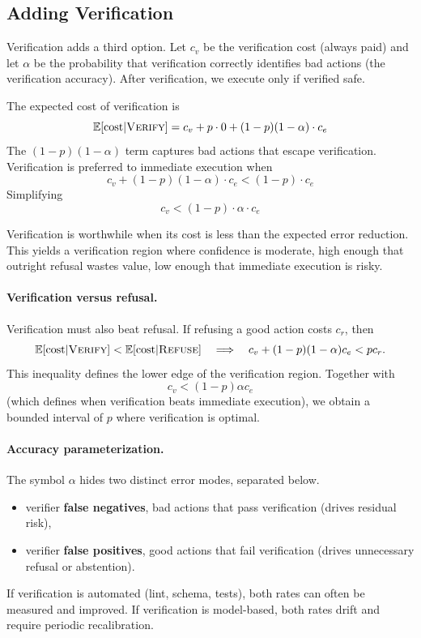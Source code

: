\subsection{Adding Verification}

Verification adds a third option. Let $c_v$ be the verification cost (always paid) and let $\alpha$ be the probability that verification correctly identifies bad actions (the verification accuracy). After verification, we execute only if verified safe.

The expected cost of verification is
\[
\mathbb{E}[\text{cost}|\textsc{Verify}] = c_v + p \cdot 0 + (1-p)(1-\alpha) \cdot c_e
\]
The $(1-p)(1-\alpha)$ term captures bad actions that escape verification. Verification is preferred to immediate execution when
\[
c_v + (1-p)(1-\alpha) \cdot c_e < (1-p) \cdot c_e
\]
Simplifying
\[
c_v < (1-p) \cdot \alpha \cdot c_e
\]

Verification is worthwhile when its cost is less than the expected error reduction. This yields a verification region where confidence is moderate, high enough that outright refusal wastes value, low enough that immediate execution is risky.

\paragraph{Verification versus refusal.}
Verification must also beat refusal. If refusing a good action costs $c_r$, then
\[
\mathbb{E}[\text{cost}|\textsc{Verify}] < \mathbb{E}[\text{cost}|\textsc{Refuse}]
\quad \Longrightarrow \quad
c_v + (1-p)(1-\alpha)c_e < p c_r.
\]
This inequality defines the lower edge of the verification region. Together with
\[
c_v < (1-p)\alpha c_e
\]
(which defines when verification beats immediate execution), we obtain a bounded interval of $p$ where verification is optimal.

\paragraph{Accuracy parameterization.}
The symbol $\alpha$ hides two distinct error modes, separated below.
\begin{itemize}
\item verifier \textbf{false negatives}, bad actions that pass verification (drives residual risk),
\item verifier \textbf{false positives}, good actions that fail verification (drives unnecessary refusal or abstention).
\end{itemize}
If verification is automated (lint, schema, tests), both rates can often be measured and improved. If verification is model-based, both rates drift and require periodic recalibration.


